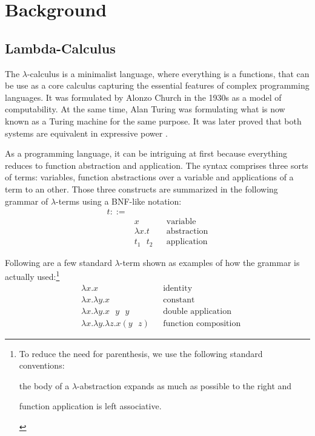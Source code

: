 \section{Background}
\label{sec:background}

\subsection{Lambda-Calculus}
\label{sec:background-lambda-calculus}

The $\lambda$-calculus is a minimalist language, where everything is a functions, that can be use as
a core calculus capturing the essential features of complex programming languages. It was formulated
by Alonzo Church \cite{???} in the 1930s as a model of computability. At the same time, Alan Turing
was formulating what is now known as a Turing machine \cite{???} for the same purpose. It was later
proved that both systems are equivalent in expressive power \cite{???}.

As a programming language, it can be intriguing at first because everything reduces to function
abstraction and application. The syntax comprises three sorts of terms: variables, function
abstractions over a variable and applications of a term to an other. Those three constructs are
summarized in the following grammar of $\lambda$-terms using a BNF-like notation:
\begin{align*}
  t ::= & \\
    & x && \text{variable} \\
    & \lambda x. t && \text{abstraction} \\
    & t_1 \text{ } t_2 && \text{application}
\end{align*}

Following are a few standard $\lambda$-term shown as examples of how the grammar is actually
used:\footnote{To reduce the need for parenthesis, we use the following standard conventions:
\begin{enumerate*}[label=(\arabic*)]
  \item the body of a $\lambda$-abstraction expands as much as possible to the right and
  \item function application is left associative.
\end{enumerate*}}
\begin{align*}
  & \lambda x. x && \text{identity} \\
  & \lambda x. \lambda y. x && \text{constant} \\
  & \lambda x. \lambda y. x \text{ } y \text{ } y && \text{double application} \\
  & \lambda x. \lambda y. \lambda z. x (y \text{ } z) && \text{function composition}
\end{align*}

